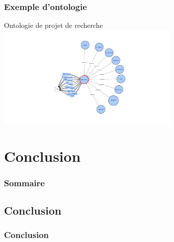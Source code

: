 \documentclass[xcolor=dvipsnames]{beamer}
\begin{document}
\begin{frame}[fragile]
\frametitle{Exemple d’ontologie}
\begin{block}{Ontologie de projet de recherche}
		\includegraphics[height = 5cm]{images/Ontologie_2.png}
\end{block}
\end{frame}



\section{Conclusion}
\begin{frame}
\frametitle{Sommaire}
\tableofcontents[currentsection]
\end{frame}


\subsection{Conclusion}
\begin{frame}[fragile]
	\frametitle{Conclusion}
\end{frame}
\end{document}
